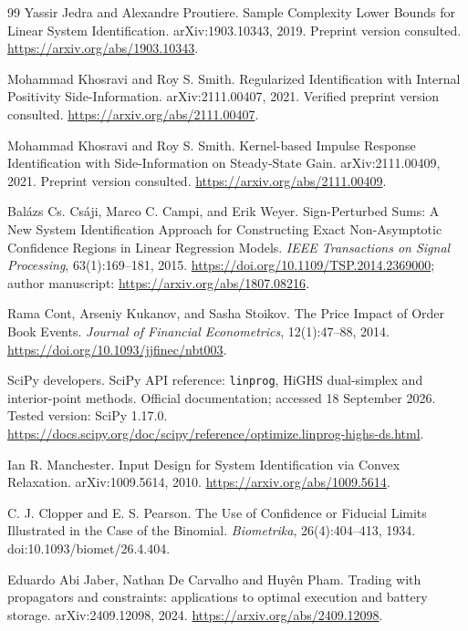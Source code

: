 \documentclass[11pt,a4paper]{article}
\theoremstyle{definition}
\theoremstyle{remark}
\begin{document}
\begin{thebibliography}{99}
Yassir Jedra and Alexandre Proutiere.
\newblock Sample Complexity Lower Bounds for Linear System Identification.
\newblock arXiv:1903.10343, 2019. Preprint version consulted.
\newblock \url{https://arxiv.org/abs/1903.10343}.

Mohammad Khosravi and Roy S. Smith.
\newblock Regularized Identification with Internal Positivity Side-Information.
\newblock arXiv:2111.00407, 2021. Verified preprint version consulted.
\newblock \url{https://arxiv.org/abs/2111.00407}.

Mohammad Khosravi and Roy S. Smith.
\newblock Kernel-based Impulse Response Identification with Side-Information on Steady-State Gain.
\newblock arXiv:2111.00409, 2021. Preprint version consulted.
\newblock \url{https://arxiv.org/abs/2111.00409}.

Bal\'azs Cs. Cs\'aji, Marco C. Campi, and Erik Weyer.
\newblock Sign-Perturbed Sums: A New System Identification Approach for Constructing Exact Non-Asymptotic Confidence Regions in Linear Regression Models.
\newblock \emph{IEEE Transactions on Signal Processing}, 63(1):169--181, 2015.
\newblock \url{https://doi.org/10.1109/TSP.2014.2369000}; author manuscript: \url{https://arxiv.org/abs/1807.08216}.

Rama Cont, Arseniy Kukanov, and Sasha Stoikov.
\newblock The Price Impact of Order Book Events.
\newblock \emph{Journal of Financial Econometrics}, 12(1):47--88, 2014.
\newblock \url{https://doi.org/10.1093/jjfinec/nbt003}.

SciPy developers.
\newblock SciPy API reference: \texttt{linprog}, HiGHS dual-simplex and interior-point methods.
\newblock Official documentation; accessed 18 September 2026. Tested version: SciPy 1.17.0.
\newblock \url{https://docs.scipy.org/doc/scipy/reference/optimize.linprog-highs-ds.html}.

Ian R. Manchester.
\newblock Input Design for System Identification via Convex Relaxation.
\newblock arXiv:1009.5614, 2010.
\newblock \url{https://arxiv.org/abs/1009.5614}.

C. J. Clopper and E. S. Pearson.
\newblock The Use of Confidence or Fiducial Limits Illustrated in the Case of the Binomial.
\newblock \emph{Biometrika}, 26(4):404--413, 1934.
\newblock doi:10.1093/biomet/26.4.404.

Eduardo Abi Jaber, Nathan De Carvalho and Huy\^en Pham.
\newblock Trading with propagators and constraints: applications to optimal execution and battery storage.
\newblock arXiv:2409.12098, 2024.
\newblock \url{https://arxiv.org/abs/2409.12098}.

\end{thebibliography}
\endgroup
\end{document}

